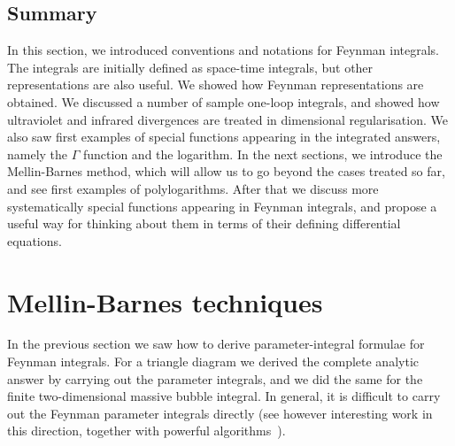 \subsection{Summary}
In this section, we introduced conventions and notations for Feynman integrals.
The integrals are initially defined as space-time integrals, but other representations are also useful.
We showed how Feynman  
representations are obtained.
We discussed a number of sample one-loop integrals, and showed how ultraviolet and infrared divergences
are treated in dimensional regularisation. 
We also saw first examples of special functions appearing in the integrated answers, namely the $\Gamma$ function and the logarithm.
In the next sections, we introduce the Mellin-Barnes method, which will allow us to go beyond the cases treated so far, and see first examples of polylogarithms.
After that we discuss more systematically special functions appearing in Feynman integrals,
and propose a useful way for thinking about them in terms of their defining differential equations.



\section{Mellin-Barnes techniques}
\label{section:mellin}

In the previous section we saw how to derive parameter-integral formulae for Feynman integrals.
For a triangle diagram we derived the complete analytic answer by carrying out the parameter integrals,
and we did the same for the finite two-dimensional massive bubble integral.
In general, it is difficult to carry out the Feynman parameter integrals directly (see however interesting work in this direction, together with powerful algorithms~\cite{ch4Panzer:2014caa}).

